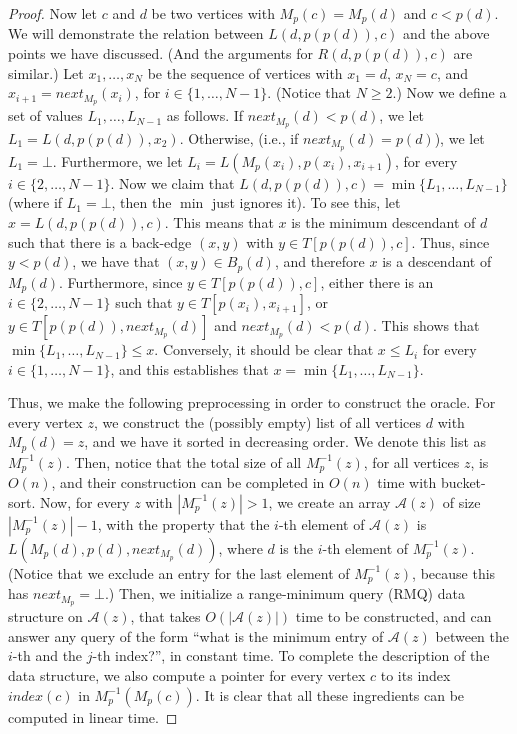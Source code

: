 \documentclass[11pt,a4paper]{article}
\begin{document}
\begin{proof}
Now let $c$ and $d$ be two vertices with $M_p(c)=M_p(d)$ and $c<p(d)$. We will demonstrate the relation between $L(d,p(p(d)),c)$ and the above points we have discussed. (And the arguments for $R(d,p(p(d)),c)$ are similar.) Let $x_1,\dots,x_N$ be the sequence of vertices with $x_1=d$, $x_N=c$, and $x_{i+1}=\mathit{next}_{M_p}(x_i)$, for $i\in\{1,\dots,N-1\}$. (Notice that $N\geq 2$.) Now we define a set of values $L_1,\dots,L_{N-1}$ as follows. If $\mathit{next}_{M_p}(d)<p(d)$, we let $L_1=L(d,p(p(d)),x_2)$. Otherwise, (i.e., if $\mathit{next}_{M_p}(d)=p(d)$), we let $L_1=\bot$. Furthermore, we let $L_i=L(M_p(x_i),p(x_i),x_{i+1})$, for every $i\in\{2,\dots,N-1\}$. Now we claim that $L(d,p(p(d)),c)=\min\{L_1,\dots,L_{N-1}\}$ (where if $L_1=\bot$, then the $\min$ just ignores it). To see this, let $x=L(d,p(p(d)),c)$. This means that $x$ is the minimum descendant of $d$ such that there is a back-edge $(x,y)$ with $y\in T[p(p(d)),c]$. Thus, since $y<p(d)$, we have that $(x,y)\in B_p(d)$, and therefore $x$ is a descendant of $M_p(d)$. Furthermore, since $y\in T[p(p(d)),c]$, either there is an $i\in\{2,\dots,N-1\}$ such that $y\in T[p(x_i),x_{i+1}]$, or $y\in T[p(p(d)),\mathit{next}_{M_p}(d)]$ and $\mathit{next}_{M_p}(d)<p(d)$. This shows that $\min\{L_1,\dots,L_{N-1}\}\leq x$. Conversely, it should be clear that $x\leq L_i$ for every $i\in\{1,\dots,N-1\}$, and this establishes that $x=\min\{L_1,\dots,L_{N-1}\}$.

Thus, we make the following preprocessing in order to construct the oracle. For every vertex $z$, we construct the (possibly empty) list of all vertices $d$ with $M_p(d)=z$, and we have it sorted in decreasing order. We denote this list as $M_p^{-1}(z)$. Then, notice that the total size of all $M_p^{-1}(z)$, for all vertices $z$, is $O(n)$, and their construction can be completed in $O(n)$ time with bucket-sort. Now, for every $z$ with $|M_p^{-1}(z)|>1$, we create an array $\mathcal{A}(z)$ of size $|M_p^{-1}(z)|-1$, with the property that the $i$-th element of $\mathcal{A}(z)$ is $L(M_p(d),p(d),\mathit{next}_{M_p}(d))$, where $d$ is the $i$-th element of $M_p^{-1}(z)$. (Notice that we exclude an entry for the last element of $M_p^{-1}(z)$, because this has $\mathit{next}_{M_p}=\bot$.) Then, we initialize a range-minimum query (RMQ) data structure \cite{DBLP:conf/cpm/FischerH06} on $\mathcal{A}(z)$, that takes $O(|\mathcal{A}(z)|)$ time to be constructed, and can answer any query of the form ``what is the minimum entry of $\mathcal{A}(z)$ between the $i$-th and the $j$-th index?'', in constant time. To complete the description of the data structure, we also compute a pointer for every vertex $c$ to its index $\mathit{index}(c)$ in $M_p^{-1}(M_p(c))$. It is clear that all these ingredients can be computed in linear time. 


\end{proof}
\end{document}
